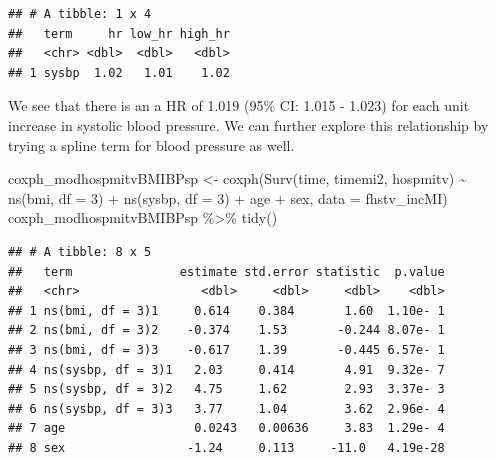 \documentclass[
]{book}
\newenvironment{Shaded}{\begin{snugshade}}{\end{snugshade}}
\newcommand{\AttributeTok}[1]{\textcolor[rgb]{0.77,0.63,0.00}{#1}}
\newcommand{\DecValTok}[1]{\textcolor[rgb]{0.00,0.00,0.81}{#1}}
\newcommand{\FunctionTok}[1]{\textcolor[rgb]{0.00,0.00,0.00}{#1}}
\newcommand{\NormalTok}[1]{#1}
\newcommand{\OtherTok}[1]{\textcolor[rgb]{0.56,0.35,0.01}{#1}}
\newcommand{\SpecialCharTok}[1]{\textcolor[rgb]{0.00,0.00,0.00}{#1}}
\begin{document}
\begin{verbatim}
## # A tibble: 1 x 4
##   term     hr low_hr high_hr
##   <chr> <dbl>  <dbl>   <dbl>
## 1 sysbp  1.02   1.01    1.02
\end{verbatim}

We see that there is an a HR of 1.019 (95\% CI: 1.015 - 1.023) for each unit increase in systolic blood pressure. We can further explore this relationship by trying a spline term for blood pressure as well.

\begin{Shaded}
\begin{Highlighting}[]
\NormalTok{coxph\_modhospmitvBMIBPsp }\OtherTok{\textless{}{-}} \FunctionTok{coxph}\NormalTok{(}\FunctionTok{Surv}\NormalTok{(time, timemi2, hospmitv) }\SpecialCharTok{\textasciitilde{}} 
                                    \FunctionTok{ns}\NormalTok{(bmi, }\AttributeTok{df =} \DecValTok{3}\NormalTok{) }\SpecialCharTok{+} \FunctionTok{ns}\NormalTok{(sysbp, }\AttributeTok{df =} \DecValTok{3}\NormalTok{) }\SpecialCharTok{+}\NormalTok{ age }\SpecialCharTok{+}\NormalTok{ sex, }
                                  \AttributeTok{data =}\NormalTok{ fhstv\_incMI)}
\NormalTok{coxph\_modhospmitvBMIBPsp }\SpecialCharTok{\%\textgreater{}\%}
  \FunctionTok{tidy}\NormalTok{()}
\end{Highlighting}
\end{Shaded}

\begin{verbatim}
## # A tibble: 8 x 5
##   term               estimate std.error statistic  p.value
##   <chr>                 <dbl>     <dbl>     <dbl>    <dbl>
## 1 ns(bmi, df = 3)1     0.614    0.384       1.60  1.10e- 1
## 2 ns(bmi, df = 3)2    -0.374    1.53       -0.244 8.07e- 1
## 3 ns(bmi, df = 3)3    -0.617    1.39       -0.445 6.57e- 1
## 4 ns(sysbp, df = 3)1   2.03     0.414       4.91  9.32e- 7
## 5 ns(sysbp, df = 3)2   4.75     1.62        2.93  3.37e- 3
## 6 ns(sysbp, df = 3)3   3.77     1.04        3.62  2.96e- 4
## 7 age                  0.0243   0.00636     3.83  1.29e- 4
## 8 sex                 -1.24     0.113     -11.0   4.19e-28
\end{verbatim}
\end{document}
